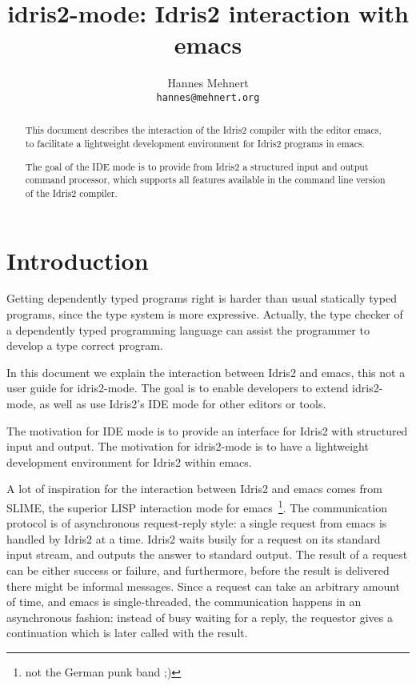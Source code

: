 \documentclass{article}
\title{idris2-mode: Idris2 interaction with emacs}
\author{Hannes Mehnert\\\texttt{hannes@mehnert.org}}
\begin{document}
\sloppy
\maketitle

\begin{abstract}
This document describes the interaction of the Idris2 compiler with the editor emacs, to facilitate a lightweight development environment for Idris2 programs in emacs.

The goal of the IDE mode is to provide from Idris2 a structured input and output command processor, which supports all features available in the command line version of the Idris2 compiler.
\end{abstract}

\section{Introduction}
Getting dependently typed programs right is harder than usual statically typed programs, since the type system is more expressive.
Actually, the type checker of a dependently typed programming language can assist the programmer to develop a type correct program.

In this document we explain the interaction between Idris2 and emacs, this not a user guide for idris2-mode.
The goal is to enable developers to extend idris2-mode, as well as use Idris2's IDE mode for other editors or tools.

The motivation for IDE mode is to provide an interface for Idris2 with structured input and output.
The motivation for idris2-mode is to have a lightweight development environment for Idris2 within emacs.

A lot of inspiration for the interaction between Idris2 and emacs comes from SLIME, the superior LISP interaction mode for emacs~\footnote{not the German punk band ;)}.
The communication protocol is of asynchronous request-reply style: a single request from emacs is handled by Idris2 at a time.
Idris2 waits busily for a request on its standard input stream, and outputs the answer to standard output.
The result of a request can be either success or failure, and furthermore, before the result is delivered there might be informal messages.
Since a request can take an arbitrary amount of time, and emacs is single-threaded, the communication happens in an asynchronous fashion: instead of busy waiting for a reply, the requestor gives a continuation which is later called with the result.
\end{document}
